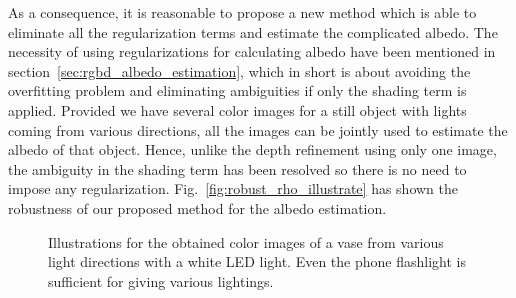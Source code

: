 As a consequence, it is reasonable to propose a new method which is able to eliminate all the regularization terms and estimate the complicated albedo.
The necessity of using regularizations for calculating albedo have been mentioned in section~\ref{sec:rgbd_albedo_estimation}, which in short is about avoiding the overfitting problem and eliminating ambiguities if only the shading term is applied.
Provided we have several color images for a still object with lights coming from various directions, all the images can be jointly used to estimate the albedo of that object.
Hence, unlike the depth refinement using only one image, the ambiguity in the shading term has been resolved so there is no need to impose any regularization.
Fig.~\ref{fig:robust_rho_illustrate} has shown the robustness of our proposed method for the albedo estimation.

\begin{figure}[!htbp]
\centering
{}
\caption{Illustrations for the obtained color images of a vase from various light directions with a white LED light. Even the phone flashlight is sufficient for giving various lightings.}
\label{fig:robust_setup}
\end{figure}


